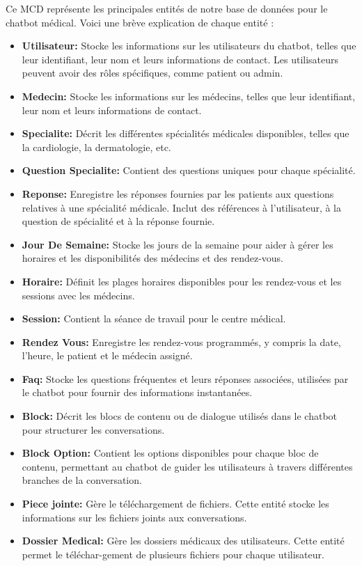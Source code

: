 Ce MCD représente les principales entités de notre base de données pour le chatbot médical. Voici une brève explication de chaque entité :


\begin{itemize}
  \item \textbf{Utilisateur: }Stocke les informations sur les utilisateurs du chatbot, telles que leur identifiant, leur nom et leurs informations de contact. Les utilisateurs peuvent avoir des rôles spécifiques, comme patient ou admin.
  \item \textbf{Medecin: }Stocke les informations sur les médecins, telles que leur identifiant, leur nom et leurs informations de contact.
  \item \textbf{Specialite: }Décrit les différentes spécialités médicales disponibles, telles que la cardiologie, la dermatologie, etc.
  \item \textbf{Question Specialite: }Contient des questions uniques pour chaque spécialité.
  \item \textbf{Reponse: }Enregistre les réponses fournies par les patients aux questions relatives à une spécialité médicale. Inclut des références à l'utilisateur, à la question de spécialité et à la réponse fournie.
  \item \textbf{Jour De Semaine: }Stocke les jours de la semaine pour aider à gérer les horaires et les disponibilités des médecins et des rendez-vous.
  \item \textbf{Horaire: }Définit les plages horaires disponibles pour les rendez-vous et les sessions avec les médecins.
  \item \textbf{Session: }Contient la séance de travail pour le centre médical.
  \item \textbf{Rendez Vous: }Enregistre les rendez-vous programmés, y compris la date, l'heure, le patient et le médecin assigné.
  \item \textbf{Faq: }Stocke les questions fréquentes et leurs réponses associées, utilisées par le chatbot pour fournir des informations instantanées.
  \item \textbf{Block: }Décrit les blocs de contenu ou de dialogue utilisés dans le chatbot pour structurer les conversations.
  \item \textbf{Block Option: }Contient les options disponibles pour chaque bloc de contenu, permettant au chatbot de guider les utilisateurs à travers différentes branches de la conversation.
  \item \textbf{Piece jointe: }Gère le téléchargement de fichiers. Cette entité stocke les informations sur les fichiers joints aux conversations.
  \item \textbf{Dossier Medical: }Gère les dossiers médicaux des utilisateurs. Cette entité permet le téléchar-gement de plusieurs fichiers pour chaque utilisateur.
\end{itemize}



